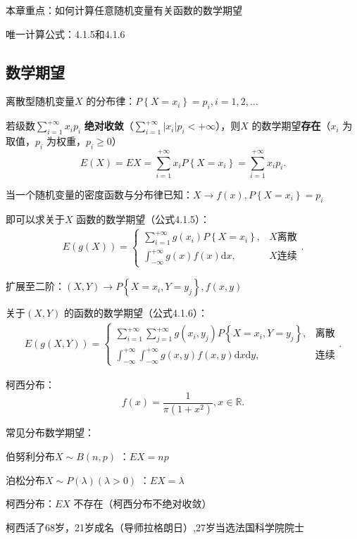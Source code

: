 本章重点：如何计算任意随机变量有关函数的数学期望

唯一计算公式：4.1.5和4.1.6
\subsection{数学期望}%
\label{sub:数学期望}
\begin{defi}
    离散型随机变量$X$ 的分布律：$P\left\{ X=x_i \right\} =p_i,i=1,2,\ldots$ 

    若级数${\sum_{i=1}^{+\infty} x_ip_i}$ \textbf{绝对收敛}（${\sum_{i=1}^{+\infty} \left| x_i \right| p_i<+\infty}$），则$X$ 的数学期望\textbf{存在}（$x_i$ 为取值，$p_i$ 为权重，$p_i\ge 0$）
    \[
        E\left( X \right) =EX=\sum_{i=1}^{+\infty} x_iP\left\{ X=x_i \right\} =\sum_{i=1}^{+\infty} x_ip_i
    .\] 
\end{defi}
\begin{rrule}
    当一个随机变量的密度函数与分布律已知：$X\to f\left( x \right),P\left\{ X=x_i \right\} =p_i $

    即可以求关于$X$ 函数的数学期望（公式4.1.5）：
    \begin{align*}
        E\left( g\left( X \right)  \right) =\begin{cases}
            {\sum_{i=1}^{+\infty} g\left( x_i \right) P\left\{ X=x_i \right\} },&X\text{离散}\\
            {\int_{-\infty}^{+\infty} g\left( x \right) f\left( x \right)  \mathrm{d}x},&X\text{连续}
        \end{cases}
    .\end{align*}
\end{rrule}
\begin{rrule}
    扩展至二阶：$\left( X,Y \right) \to P\left\{ X=x_{i},Y=y_{j} \right\} ,f\left( x,y \right) $ 

    关于$\left( X,Y \right) $ 的函数的数学期望（公式4.1.6）：
    \begin{align*}
        E\left( g\left( X,Y \right)  \right) =\begin{cases}
            {\sum_{i=1}^{+\infty}{\sum_{j=1}^{+\infty} g\left( x_{i},y_{j} \right) P\left\{ X=x_{i},Y=y_{j} \right\}} },&\text{离散}\\
            {\int_{-\infty}^{+\infty}{\int_{-\infty}^{+\infty} g\left( x,y \right) f\left( x,y \right)  \mathrm{d}x} \mathrm{d}y},&\text{连续}
        \end{cases}
    .\end{align*}
\end{rrule}
\begin{notation}
    柯西分布：\[
        f\left( x \right) =\frac{1}{\pi\left( 1+x^2 \right) },x\in \mathbb{R}
    .\] 
\end{notation}
常见分布数学期望：
\begin{notation}
    伯努利分布$X\sim B\left( n,p \right) $ ：$EX=np$ 

    泊松分布$X\sim P\left( \lambda \right) \left( \lambda>0 \right) $ ：$EX=\lambda$ 

    柯西分布：$EX$ 不存在（柯西分布不绝对收敛）
\end{notation}
\begin{notation}
    柯西活了68岁，21岁成名（导师拉格朗日）,27岁当选法国科学院院士
\end{notation}
